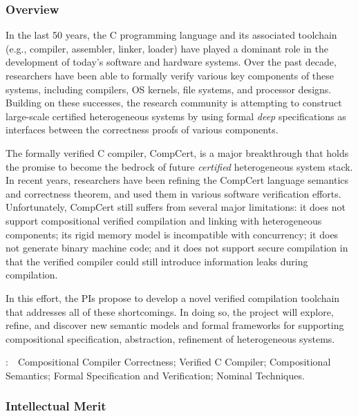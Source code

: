 \subsubsection*{Overview}

In the last 50 years, the C programming language and its associated
toolchain (e.g., compiler, assembler, linker, loader) have played a
dominant role in the development of today's software and hardware
systems.  Over the past decade, researchers have been able to formally
verify various key components of these systems, including compilers,
OS kernels, file systems, and processor designs. Building on these
successes, the research community is attempting to construct
large-scale certified heterogeneous systems by using formal {\em deep}
specifications as interfaces between the correctness proofs of various
components.

The formally verified C compiler, CompCert, is a major breakthrough
that holds the promise to become the bedrock of future {\em certified}
heterogeneous system stack. In recent years, researchers have been
refining the CompCert language semantics and correctness theorem, and
used them in various software verification efforts.  Unfortunately,
CompCert still suffers from several major limitations: it does
not support compositional verified compilation and linking with
heterogeneous components; its rigid memory model is incompatible with
concurrency; it does not generate binary machine code; and it does not
support secure compilation in that the verified compiler could still
introduce information leaks during compilation.

In this effort, the PIs propose to develop a novel verified
compilation toolchain that addresses all of these shortcomings. In
doing so, the project will explore, refine, and discover new semantic
models and formal frameworks for supporting compositional
specification, abstraction, refinement of heterogeneous systems.

\vspace{+2mm}
:~~{Compositional Compiler Correctness; Verified C Compiler; Compositional Semantics; Formal Specification and Verification; Nominal Techniques.}

\subsubsection*{Intellectual Merit}

